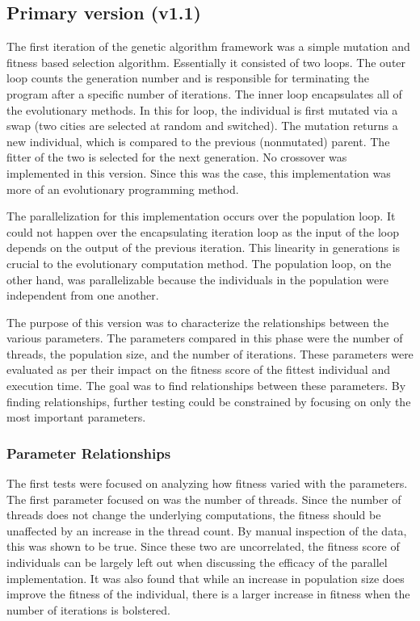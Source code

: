 \documentclass[10pt,letterpaper]{article}
\begin{document}
\subsection{Primary version (v1.1)}
The first iteration of the genetic algorithm framework was a simple mutation and fitness based selection algorithm. Essentially it consisted of two loops. The outer loop counts the generation number and is responsible for terminating the program after a specific number of iterations. The inner loop encapsulates all of the evolutionary methods. In this for loop, the individual is first mutated via a swap (two cities are selected at random and switched). The mutation returns a new individual, which is compared to the previous (nonmutated) parent. The fitter of the two is selected for the next generation. No crossover was implemented in this version. Since this was the case, this implementation was more of an evolutionary programming method.

The parallelization for this implementation occurs over the population loop. It could not happen over the encapsulating iteration loop as the input of the loop depends on the output of the previous iteration. This linearity in generations is crucial to the evolutionary computation method. The population loop, on the other hand, was parallelizable because the individuals in the population were independent from one another.

The purpose of this version was to characterize the relationships between the various parameters. The parameters compared in this phase were the number of threads, the population size, and the number of iterations. These parameters were evaluated as per their impact on the fitness score of the fittest individual and execution time. The goal was to find relationships between these parameters. By finding relationships, further testing could be constrained by focusing on only the most important parameters.


\subsubsection{Parameter Relationships}
The first tests were focused on analyzing how fitness varied with the parameters. The first parameter focused on was the number of threads. Since the number of threads does not change the underlying computations, the fitness should be unaffected by an increase in the thread count. By manual inspection of the data, this was shown to be true. Since these two are uncorrelated, the fitness score of individuals can be largely left out when discussing the efficacy of the parallel implementation. It was also found that while an increase in population size does improve the fitness of the individual, there is a larger increase in fitness when the number of iterations is bolstered.
\end{document}
